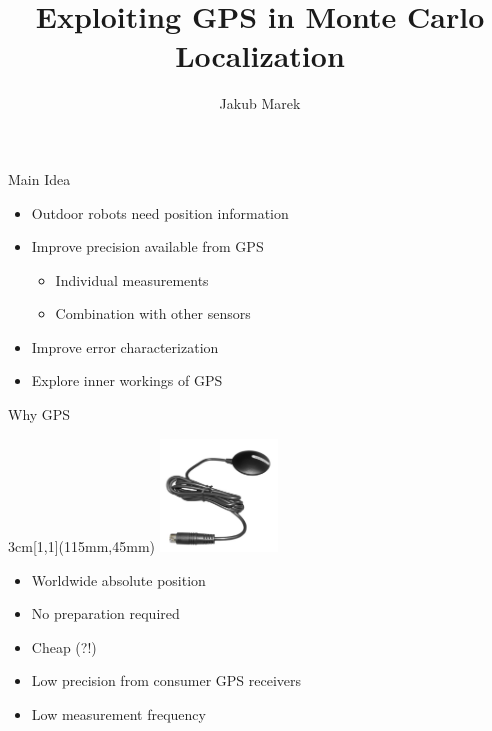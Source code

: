 \documentclass[utf8,12pt]{beamer}
\title{Exploiting GPS in Monte Carlo Localization}
\author{Jakub Marek}
\newcommand{\imageframe}[3]{{
\setbeamertemplate{background}{
    \vbox to \paperheight{\vfil\hbox to \paperwidth{\hfil
    \texttt{[image: \#1]} %
    \hfil}\vfil}
    }
\setbeamercolor{background canvas}{bg=#2}
\begin{frame}[plain]
\end{frame}
}}
\begin{document}
\begin{frame}[plain]
    \titlepage
\end{frame}

\begin{frame}{Main Idea}
    \begin{itemize}
        \item Outdoor robots need position information
        \item Improve precision available from GPS
        \begin{itemize}
            \item Individual measurements
            \item Combination with other sensors
        \end{itemize}
        \item Improve error characterization
        \item Explore inner workings of GPS
    \end{itemize}
\end{frame}


\begin{frame}{Why GPS}
    \begin{textblock*}{3cm}[1,1](115mm,45mm)
        \includegraphics[height=3cm]{img/receiver.jpg}
    \end{textblock*}
    \begin{itemize}
        \item Worldwide absolute position
        \item No preparation required
        \item Cheap (?!)
    \end{itemize}

    \begin{itemize}
        \item Low precision from consumer GPS receivers
        \item Low measurement frequency
    \end{itemize}
\end{frame}
\end{document}
